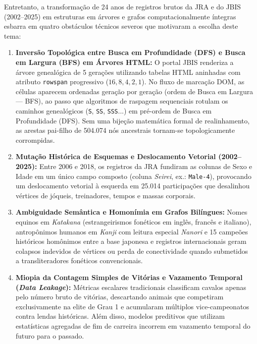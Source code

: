 \documentclass[conference]{IEEEtran}
\begin{document}
Entretanto, a transformação de 24 anos de registros brutos da JRA e do JBIS (2002--2025) em estruturas em árvores e grafos computacionalmente íntegras esbarra em quatro obstáculos técnicos severos que motivaram a escolha deste tema:
\begin{enumerate}
    \item \textbf{Inversão Topológica entre Busca em Profundidade (DFS) e Busca em Largura (BFS) em Árvores HTML:} O portal JBIS renderiza a árvore genealógica de 5 gerações utilizando tabelas HTML aninhadas com atributo \texttt{rowspan} progressivo ($16, 8, 4, 2, 1$). No fluxo de marcação DOM, as células aparecem ordenadas geração por geração (ordem de Busca em Largura --- BFS), ao passo que algoritmos de raspagem sequenciais rotulam os caminhos genealógicos (\texttt{S}, \texttt{SS}, \texttt{SSS}...) em pré-ordem de Busca em Profundidade (DFS). Sem uma bijeção matemática formal de realinhamento, as arestas pai-filho de 504.074 nós ancestrais tornam-se topologicamente corrompidas.
    \item \textbf{Mutação Histórica de Esquemas e Deslocamento Vetorial (2002--2025):} Entre 2006 e 2018, os registros da JRA fundiram as colunas de Sexo e Idade em um único campo composto (coluna \textit{Seirei}, ex.: \texttt{Male-4}), provocando um deslocamento vetorial à esquerda em 25.014 participações que desalinhou vértices de jóqueis, treinadores, tempos e massas corporais.
    \item \textbf{Ambiguidade Semântica e Homonímia em Grafos Bilíngues:} Nomes equinos em \textit{Katakana} (estrangeirismos fonéticos em inglês, francês e italiano), antropônimos humanos em \textit{Kanji} com leitura especial \textit{Nanori} e 15 campeões históricos homônimos entre a base japonesa e registros internacionais geram colapsos indevidos de vértices ou perda de conectividade quando submetidos a transliteradores fonéticos convencionais.
    \item \textbf{Miopia da Contagem Simples de Vitórias e Vazamento Temporal (\textit{Data Leakage}):} Métricas escalares tradicionais classificam cavalos apenas pelo número bruto de vitórias, descartando animais que competiram exclusivamente na elite de Grau 1 e acumularam múltiplos vice-campeonatos contra lendas históricas. Além disso, modelos preditivos que utilizam estatísticas agregadas de fim de carreira incorrem em vazamento temporal do futuro para o passado.
\end{enumerate}
\end{document}
